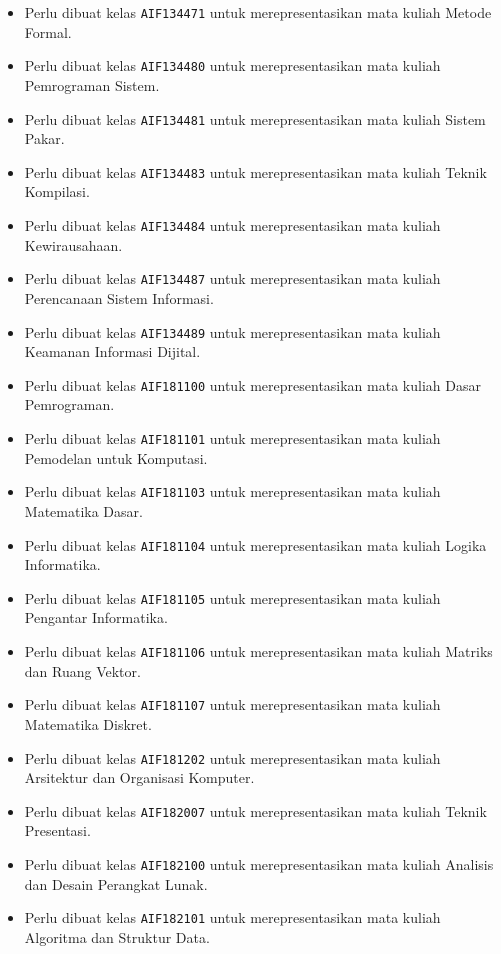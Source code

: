 \begin{enumerate}
\begin{itemize}
		\item Perlu dibuat kelas \texttt{AIF134471} untuk merepresentasikan mata kuliah Metode Formal.
		\item Perlu dibuat kelas \texttt{AIF134480} untuk merepresentasikan mata kuliah Pemrograman Sistem.
		\item Perlu dibuat kelas \texttt{AIF134481} untuk merepresentasikan mata kuliah Sistem Pakar.
		\item Perlu dibuat kelas \texttt{AIF134483} untuk merepresentasikan mata kuliah Teknik Kompilasi.
		\item Perlu dibuat kelas \texttt{AIF134484} untuk merepresentasikan mata kuliah Kewirausahaan.
		\item Perlu dibuat kelas \texttt{AIF134487} untuk merepresentasikan mata kuliah Perencanaan Sistem Informasi.
		\item Perlu dibuat kelas \texttt{AIF134489} untuk merepresentasikan mata kuliah Keamanan Informasi Dijital.
		\item Perlu dibuat kelas \texttt{AIF181100} untuk merepresentasikan mata kuliah Dasar Pemrograman.
		\item Perlu dibuat kelas \texttt{AIF181101} untuk merepresentasikan mata kuliah Pemodelan untuk Komputasi.
		\item Perlu dibuat kelas \texttt{AIF181103} untuk merepresentasikan mata kuliah Matematika Dasar.
		\item Perlu dibuat kelas \texttt{AIF181104} untuk merepresentasikan mata kuliah Logika Informatika.
		\item Perlu dibuat kelas \texttt{AIF181105} untuk merepresentasikan mata kuliah Pengantar Informatika.
		\item Perlu dibuat kelas \texttt{AIF181106} untuk merepresentasikan mata kuliah Matriks dan Ruang Vektor.
		\item Perlu dibuat kelas \texttt{AIF181107} untuk merepresentasikan mata kuliah Matematika Diskret.
		\item Perlu dibuat kelas \texttt{AIF181202} untuk merepresentasikan mata kuliah Arsitektur dan Organisasi Komputer.
		\item Perlu dibuat kelas \texttt{AIF182007} untuk merepresentasikan mata kuliah Teknik Presentasi.
		\item Perlu dibuat kelas \texttt{AIF182100} untuk merepresentasikan mata kuliah Analisis dan Desain Perangkat Lunak.
		\item Perlu dibuat kelas \texttt{AIF182101} untuk merepresentasikan mata kuliah Algoritma dan Struktur Data.

\end{itemize}
\end{enumerate}
